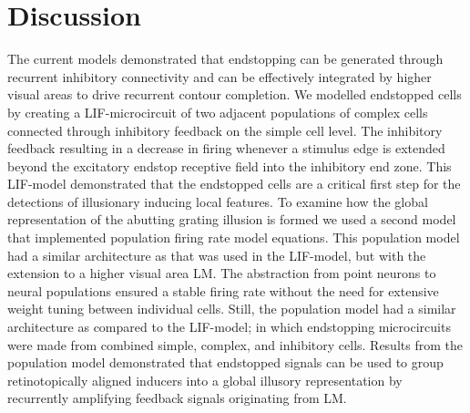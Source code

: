 \documentclass[12pt]{article}
\begin{document}
\section*{Discussion}
\setlength{\parindent}{12pt}  
The current models demonstrated that endstopping can be generated through recurrent inhibitory connectivity and can be effectively integrated by higher visual areas to drive recurrent contour completion. We modelled endstopped cells by creating a LIF-microcircuit of two adjacent populations of complex cells connected through inhibitory feedback on the simple cell level. The inhibitory feedback resulting in a decrease in firing whenever a stimulus edge is extended beyond the excitatory endstop receptive field into the inhibitory end zone. This LIF-model demonstrated that the endstopped cells are a critical first step for the detections of illusionary inducing local features. To examine how the global representation of the abutting grating illusion is formed we used a second model that implemented population firing rate model equations. This population model had a similar architecture as that was used in the LIF-model, but with the extension to a higher visual area LM. The abstraction from point neurons to neural populations ensured a stable firing rate without the need for extensive weight tuning between individual cells. Still, the population model had a similar architecture as compared to the LIF-model; in which endstopping microcircuits were made from combined simple, complex, and inhibitory cells. Results from the population model demonstrated that endstopped signals can be used to group retinotopically aligned inducers into a global illusory representation by recurrently amplifying feedback signals originating from LM. 
\setlength{\parindent}{0pt}
\bigbreak
\end{document}
